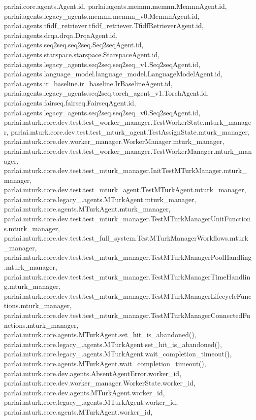 parlai.\+core.\+agents.\+Agent.\+id, parlai.\+agents.\+memnn.\+memnn.\+Memnn\+Agent.\+id, parlai.\+agents.\+legacy\+\_\+agents.\+memnn.\+memnn\+\_\+v0.\+Memnn\+Agent.\+id, parlai.\+agents.\+tfidf\+\_\+retriever.\+tfidf\+\_\+retriever.\+Tfidf\+Retriever\+Agent.\+id, parlai.\+agents.\+drqa.\+drqa.\+Drqa\+Agent.\+id, parlai.\+agents.\+seq2seq.\+seq2seq.\+Seq2seq\+Agent.\+id, parlai.\+agents.\+starspace.\+starspace.\+Starspace\+Agent.\+id, parlai.\+agents.\+legacy\+\_\+agents.\+seq2seq.\+seq2seq\+\_\+v1.\+Seq2seq\+Agent.\+id, parlai.\+agents.\+language\+\_\+model.\+language\+\_\+model.\+Language\+Model\+Agent.\+id, parlai.\+agents.\+ir\+\_\+baseline.\+ir\+\_\+baseline.\+Ir\+Baseline\+Agent.\+id, parlai.\+agents.\+legacy\+\_\+agents.\+seq2seq.\+torch\+\_\+agent\+\_\+v1.\+Torch\+Agent.\+id, parlai.\+agents.\+fairseq.\+fairseq.\+Fairseq\+Agent.\+id, parlai.\+agents.\+legacy\+\_\+agents.\+seq2seq.\+seq2seq\+\_\+v0.\+Seq2seq\+Agent.\+id, parlai.\+mturk.\+core.\+dev.\+test.\+test\+\_\+worker\+\_\+manager.\+Test\+Worker\+State.\+mturk\+\_\+manager, parlai.\+mturk.\+core.\+dev.\+test.\+test\+\_\+mturk\+\_\+agent.\+Test\+Assign\+State.\+mturk\+\_\+manager, parlai.\+mturk.\+core.\+dev.\+worker\+\_\+manager.\+Worker\+Manager.\+mturk\+\_\+manager, parlai.\+mturk.\+core.\+dev.\+test.\+test\+\_\+worker\+\_\+manager.\+Test\+Worker\+Manager.\+mturk\+\_\+manager, parlai.\+mturk.\+core.\+dev.\+test.\+test\+\_\+mturk\+\_\+manager.\+Init\+Test\+M\+Turk\+Manager.\+mturk\+\_\+manager, parlai.\+mturk.\+core.\+dev.\+test.\+test\+\_\+mturk\+\_\+agent.\+Test\+M\+Turk\+Agent.\+mturk\+\_\+manager, parlai.\+mturk.\+core.\+legacy\+\_.\+agents.\+M\+Turk\+Agent.\+mturk\+\_\+manager, parlai.\+mturk.\+core.\+agents.\+M\+Turk\+Agent.\+mturk\+\_\+manager, parlai.\+mturk.\+core.\+dev.\+test.\+test\+\_\+mturk\+\_\+manager.\+Test\+M\+Turk\+Manager\+Unit\+Functions.\+mturk\+\_\+manager, parlai.\+mturk.\+core.\+dev.\+test.\+test\+\_\+full\+\_\+system.\+Test\+M\+Turk\+Manager\+Workflows.\+mturk\+\_\+manager, parlai.\+mturk.\+core.\+dev.\+test.\+test\+\_\+mturk\+\_\+manager.\+Test\+M\+Turk\+Manager\+Pool\+Handling.\+mturk\+\_\+manager, parlai.\+mturk.\+core.\+dev.\+test.\+test\+\_\+mturk\+\_\+manager.\+Test\+M\+Turk\+Manager\+Time\+Handling.\+mturk\+\_\+manager, parlai.\+mturk.\+core.\+dev.\+test.\+test\+\_\+mturk\+\_\+manager.\+Test\+M\+Turk\+Manager\+Lifecycle\+Functions.\+mturk\+\_\+manager, parlai.\+mturk.\+core.\+dev.\+test.\+test\+\_\+mturk\+\_\+manager.\+Test\+M\+Turk\+Manager\+Connected\+Functions.\+mturk\+\_\+manager, parlai.\+mturk.\+core.\+agents.\+M\+Turk\+Agent.\+set\+\_\+hit\+\_\+is\+\_\+abandoned(), parlai.\+mturk.\+core.\+legacy\+\_.\+agents.\+M\+Turk\+Agent.\+set\+\_\+hit\+\_\+is\+\_\+abandoned(), parlai.\+mturk.\+core.\+legacy\+\_.\+agents.\+M\+Turk\+Agent.\+wait\+\_\+completion\+\_\+timeout(), parlai.\+mturk.\+core.\+agents.\+M\+Turk\+Agent.\+wait\+\_\+completion\+\_\+timeout(), parlai.\+mturk.\+core.\+dev.\+agents.\+Absent\+Agent\+Error.\+worker\+\_\+id, parlai.\+mturk.\+core.\+dev.\+worker\+\_\+manager.\+Worker\+State.\+worker\+\_\+id, parlai.\+mturk.\+core.\+dev.\+agents.\+M\+Turk\+Agent.\+worker\+\_\+id, parlai.\+mturk.\+core.\+legacy\+\_.\+agents.\+M\+Turk\+Agent.\+worker\+\_\+id, parlai.\+mturk.\+core.\+agents.\+M\+Turk\+Agent.\+worker\+\_\+id, 